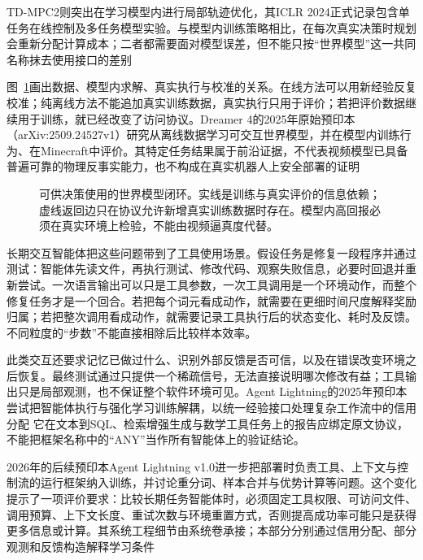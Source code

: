 TD-MPC2则突出在学习模型内进行局部轨迹优化，其ICLR 2024正式记录包含单任务在线控制及多任务模型实验。与模型内训练策略相比，在每次真实决策时规划会重新分配计算成本；二者都需要面对模型误差，但不能只按“世界模型”这一共同名称抹去使用接口的差别

图~\ref{fig:rl-overview-world-loop}画出数据、模型内求解、真实执行与校准的关系。在线方法可以用新经验反复校准；纯离线方法不能追加真实训练数据，真实执行只用于评价；若把评价数据继续用于训练，就已经改变了访问协议。Dreamer 4的2025年原始预印本（arXiv:2509.24527v1）研究从离线数据学习可交互世界模型，并在模型内训练行为、在Minecraft中评价。其特定任务结果属于前沿证据，不代表视频模型已具备普遍可靠的物理反事实能力，也不构成在真实机器人上安全部署的证明

\begin{figure}[htbp]
  \centering
  
  \caption{可供决策使用的世界模型闭环。实线是训练与真实评价的信息依赖；虚线返回边只在协议允许新增真实训练数据时存在。模型内高回报必须在真实环境上检验，不能由视频逼真度代替。}
  \label{fig:rl-overview-world-loop}
\end{figure}

长期交互智能体把这些问题带到了工具使用场景。假设任务是修复一段程序并通过测试：智能体先读文件，再执行测试、修改代码、观察失败信息，必要时回退并重新尝试。一次语言输出可以只是工具参数，一次工具调用是一个环境动作，而整个修复任务才是一个回合。若把每个词元看成动作，就需要在更细时间尺度解释奖励归属；若把整次调用看成动作，就需要记录工具执行后的状态变化、耗时及反馈。不同粒度的“步数”不能直接相除后比较样本效率。

此类交互还要求记忆已做过什么、识别外部反馈是否可信，以及在错误改变环境之后恢复。最终测试通过只提供一个稀疏信号，无法直接说明哪次修改有益；工具输出只是局部观测，也不保证整个软件环境可见。Agent Lightning的2025年预印本尝试把智能体执行与强化学习训练解耦，以统一经验接口处理复杂工作流中的信用分配
它在文本到SQL、检索增强生成与数学工具任务上的报告应绑定原文协议，不能把框架名称中的“ANY”当作所有智能体上的验证结论。

2026年的后续预印本Agent Lightning v1.0进一步把部署时负责工具、上下文与控制流的运行框架纳入训练，并讨论重分词、样本合并与优势计算等问题。这个变化提示了一项评价要求：比较长期任务智能体时，必须固定工具权限、可访问文件、调用预算、上下文长度、重试次数与环境重置方式，否则提高成功率可能只是获得更多信息或计算。其系统工程细节由系统卷承接；本部分分别通过信用分配、部分观测和反馈构造解释学习条件

